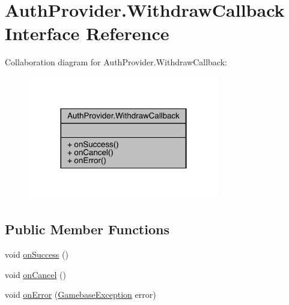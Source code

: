 \hypertarget{interfacecom_1_1toast_1_1android_1_1gamebase_1_1base_1_1auth_1_1_auth_provider_1_1_withdraw_callback}{}\section{Auth\+Provider.\+Withdraw\+Callback Interface Reference}
\label{interfacecom_1_1toast_1_1android_1_1gamebase_1_1base_1_1auth_1_1_auth_provider_1_1_withdraw_callback}


Collaboration diagram for Auth\+Provider.\+Withdraw\+Callback\+:
\nopagebreak
\begin{figure}[H]
\begin{center}
\leavevmode
\includegraphics[width=236pt]{interfacecom_1_1toast_1_1android_1_1gamebase_1_1base_1_1auth_1_1_auth_provider_1_1_withdraw_callback__coll__graph}
\end{center}
\end{figure}
\subsection*{Public Member Functions}
\begin{DoxyCompactItemize}
\item 
void \hyperlink{interfacecom_1_1toast_1_1android_1_1gamebase_1_1base_1_1auth_1_1_auth_provider_1_1_withdraw_callback_a6ecba2d0ac542f91a477cfe6ce25b102}{on\+Success} ()
\item 
void \hyperlink{interfacecom_1_1toast_1_1android_1_1gamebase_1_1base_1_1auth_1_1_auth_provider_1_1_withdraw_callback_a5a5a8c7638e17aa6d75298875b91a597}{on\+Cancel} ()
\item 
void \hyperlink{interfacecom_1_1toast_1_1android_1_1gamebase_1_1base_1_1auth_1_1_auth_provider_1_1_withdraw_callback_aa7fdd9a38f0067a729ab73deef9c9003}{on\+Error} (\hyperlink{classcom_1_1toast_1_1android_1_1gamebase_1_1base_1_1_gamebase_exception}{Gamebase\+Exception} error)
\end{DoxyCompactItemize}


